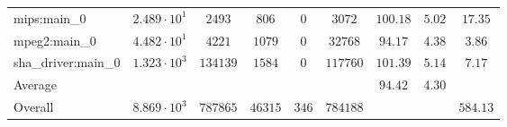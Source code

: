 \begin{tabular}{|l|c|c|c|c|c|c|c|c|}
mips:main\_0            & $ 2.489 \cdot 10^{1} $ & $ 2493   $ & $ 806   $ & $ 0   $ & $ 3072   $ & $ 100.18      $ & $ 5.02    $ & $ 17.35   $ \\
mpeg2:main\_0           & $ 4.482 \cdot 10^{1} $ & $ 4221   $ & $ 1079  $ & $ 0   $ & $ 32768  $ & $ 94.17       $ & $ 4.38    $ & $ 3.86    $ \\
sha\_driver:main\_0     & $ 1.323 \cdot 10^{3} $ & $ 134139 $ & $ 1584  $ & $ 0   $ & $ 117760 $ & $ 101.39      $ & $ 5.14    $ & $ 7.17    $ \\
\hline
Average                 & $                    $ & $        $ & $       $ & $     $ & $        $ & $ 94.42       $ & $ 4.30    $ & $         $ \\
\hline
Overall                 & $ 8.869 \cdot 10^{3} $ & $ 787865 $ & $ 46315 $ & $ 346 $ & $ 784188 $ & $             $ & $         $ & $ 584.13  $ \\
\hline
\end{tabular}
